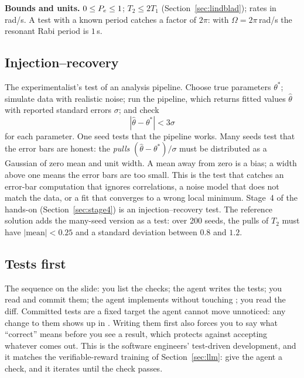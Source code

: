 \textbf{Bounds and units.} $0 \leq P_e \leq 1$; $T_2 \leq 2T_1$ (Section~\ref{sec:lindblad});
rates in rad/\textmu s. A test with a known period catches a factor of $2\pi$: with
$\Omega = 2\pi$\,rad/\textmu s the resonant Rabi period is $1$\,\textmu s.

\subsection{Injection--recovery}

The experimentalist's test of an analysis pipeline. Choose true parameters
$\theta^\ast$; simulate data with realistic noise; run the pipeline, which returns fitted
values $\hat\theta$ with reported standard errors $\sigma$; and check
\begin{equation}
  \left|\hat\theta - \theta^\ast\right| < 3\sigma
\end{equation}
for each parameter. One seed tests that the pipeline works. Many seeds test that the
error bars are honest: the \emph{pulls} $(\hat\theta - \theta^\ast)/\sigma$ must be
distributed as a Gaussian of zero mean and unit width. A mean away from zero is a bias;
a width above one means the error bars are too small. This is the test that catches an
error-bar computation that ignores correlations, a noise model that does not match the
data, or a fit that converges to a wrong local minimum. Stage~4 of the hands-on
(Section~\ref{sec:stage4}) is an injection--recovery test. The reference solution adds the
many-seed version as a test: over 200 seeds, the pulls of $T_2$ must have
$|\text{mean}| < 0.25$ and a standard deviation between $0.8$ and $1.2$.

\subsection{Tests first}

The sequence on the slide: you list the checks; the agent writes the tests; you read and
commit them; the agent implements without touching ; you read the diff.
Committed tests are a fixed target the agent cannot move unnoticed: any change to them
shows up in . Writing them first also forces you to say what
``correct'' means before you see a result, which protects against accepting whatever
comes out. This is the software engineers' test-driven development, and it matches the
verifiable-reward training of Section~\ref{sec:llm}: give the agent a check, and it
iterates until the check passes.

